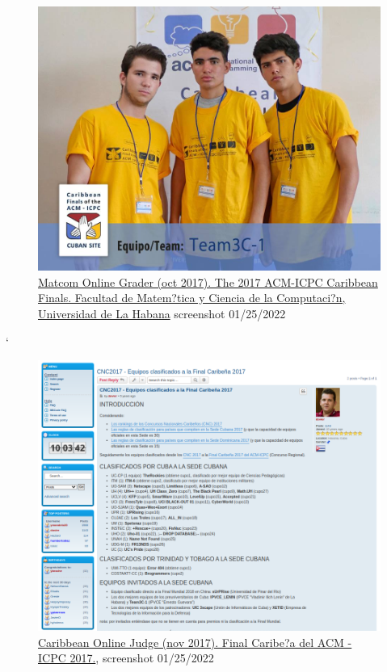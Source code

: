 \documentclass[a4paper,12pt]{article}
\begin{document}
\begin{figure}[h]
    \centering
    \includegraphics[width=\textwidth]{images/team3c.jpg}
    \caption{\href{https://matcomgrader.com/post/5167/the-2017-acm-icpc-caribbean-finals}{Matcom Online Grader (oct 2017). The 2017 ACM-ICPC Caribbean Finals. Facultad de Matem?tica y Ciencia de la Computaci?n, Universidad de La Habana} screenshot 01/25/2022}
    \label{sec:3c}
\end{figure}
`\begin{figure}[h]
    \centering
    \includegraphics[width=\textwidth]{images/icpc_classified.png}
    \caption{\href{ https://coj-forum.uci.cu/viewtopic.php?t=3315}{Caribbean Online Judge (nov 2017). Final Caribe?a del ACM - ICPC 2017.}, screenshot 01/25/2022}
    \label{sec:icpc}
\end{figure}
\end{document}
